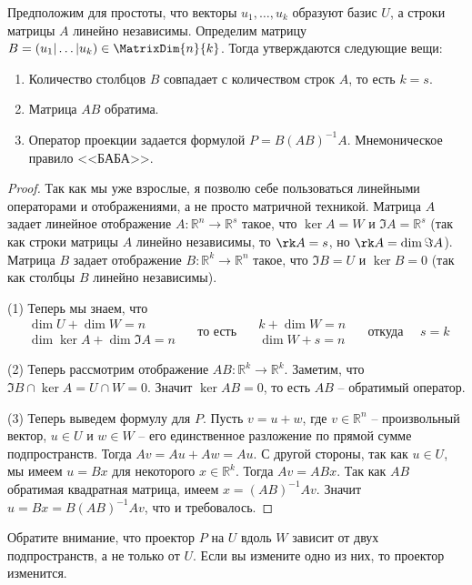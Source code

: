 Предположим для простоты, что векторы $u_1,\ldots,u_k$ образуют базис $U$, а строки матрицы $A$ линейно независимы.
Определим матрицу $B = (u_1|\ldots|u_k)\in \MatrixDim{n}{k}$.
Тогда утверждаются следующие вещи:
\begin{enumerate}
\item Количество столбцов $B$ совпадает с количеством строк $A$, то есть $k = s$.

\item Матрица $AB$ обратима.

\item Оператор проекции задается формулой $P = B(AB)^{-1}A$.
Мнемоническое правило <<БАБА>>.
\end{enumerate}
\begin{proof}
Так как мы уже взрослые, я позволю себе пользоваться линейными операторами и отображениями, а не просто матричной техникой.
Матрица $A$ задает линейное отображение $A\colon \mathbb R^n \to \mathbb R^s$ такое, что $\ker A = W$ и $\Im A = \mathbb R^s$ (так как строки матрицы $A$ линейно независимы, то $\rk A = s$, но $\rk A = \dim \Im A$).
Матрица $B$ задает отображение $B\colon \mathbb R^k \to \mathbb R^n$ такое, что $\Im B = U$ и $\ker B = 0$ (так как столбцы $B$ линейно независимы).

(1) Теперь мы знаем, что 
\[
\begin{aligned}
\dim U + \dim W = n\\
\dim \ker A + \dim \Im A = n
\end{aligned}
\quad\text{ то есть }\quad
\begin{aligned}
k + \dim W = n\\
\dim W+ s= n
\end{aligned}
\quad\text{ откуда }\quad
s = k
\]

(2) Теперь рассмотрим отображение $AB\colon \mathbb R^k \to \mathbb R^k$.
Заметим, что $\Im B \cap \ker A = U \cap W = 0$.
Значит $\ker AB = 0$, то есть $AB$ -- обратимый оператор.

(3) Теперь выведем формулу для $P$.
Пусть $v = u + w$, где $v\in \mathbb R^n$ -- произвольный вектор, $u\in U$ и $w\in W$ -- его единственное разложение по прямой сумме подпространств.
Тогда $Av = Au + Aw = Au$.
С другой стороны, так как $u\in U$, мы имеем $u = B x$ для некоторого $x\in \mathbb R^k$.
Тогда $Av = ABx$.
Так как $AB$ обратимая квадратная матрица, имеем $x = (AB)^{-1}Av$.
Значит $u = Bx = B(AB)^{-1}Av$, что и требовалось.
\end{proof}

Обратите внимание, что проектор $P$ на $U$ вдоль $W$ зависит от двух подпространств, а не только от $U$.
Если вы измените одно из них, то проектор изменится.

